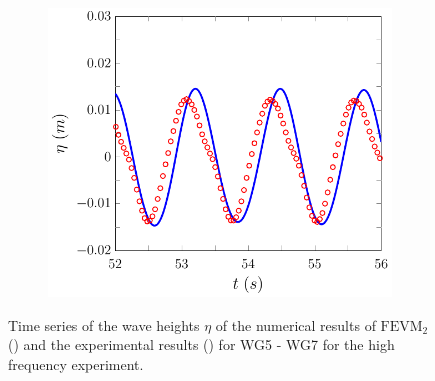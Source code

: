 \begin{figure}
\begin{subfigure}{0.5\textwidth}
		\vspace{0.5cm}
	\end{subfigure}
	\begin{subfigure}{0.5\textwidth}
		\includegraphics[width=\textwidth]{./chp6/figures/Experiment/Beji/sh/FEVMWG7.pdf}
		\vspace{0.5cm}
	\end{subfigure}
	\caption{Time series of the wave heights $\eta$ of the numerical results of $\text{FEVM}_2$ ({\color{blue}\solidrule}) and the experimental results () for WG5 - WG7 for the high frequency experiment.}
	\label{fig:BejishWG5to7FEVM}
\end{figure}
%
